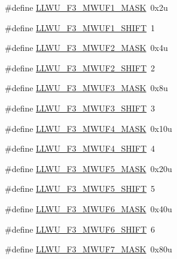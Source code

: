 \begin{DoxyCompactItemize}
\#define \hyperlink{group___l_l_w_u___register___masks_gafe847acbd5a46291dd05b8ab682efffe}{L\+L\+W\+U\+\_\+\+F3\+\_\+\+M\+W\+U\+F1\+\_\+\+M\+A\+SK}~0x2u
\item 
\#define \hyperlink{group___l_l_w_u___register___masks_ga6de4a2380bde727b70758cd1c818c859}{L\+L\+W\+U\+\_\+\+F3\+\_\+\+M\+W\+U\+F1\+\_\+\+S\+H\+I\+FT}~1
\item 
\#define \hyperlink{group___l_l_w_u___register___masks_ga3414123c30550a3dea14d84f931e2a0c}{L\+L\+W\+U\+\_\+\+F3\+\_\+\+M\+W\+U\+F2\+\_\+\+M\+A\+SK}~0x4u
\item 
\#define \hyperlink{group___l_l_w_u___register___masks_gac83dee08de7a4bdce21d454a9cfab059}{L\+L\+W\+U\+\_\+\+F3\+\_\+\+M\+W\+U\+F2\+\_\+\+S\+H\+I\+FT}~2
\item 
\#define \hyperlink{group___l_l_w_u___register___masks_gab85f671f2c6f2112c4e2e14845ef998b}{L\+L\+W\+U\+\_\+\+F3\+\_\+\+M\+W\+U\+F3\+\_\+\+M\+A\+SK}~0x8u
\item 
\#define \hyperlink{group___l_l_w_u___register___masks_ga91a71ba06b95076252cd2594112da05d}{L\+L\+W\+U\+\_\+\+F3\+\_\+\+M\+W\+U\+F3\+\_\+\+S\+H\+I\+FT}~3
\item 
\#define \hyperlink{group___l_l_w_u___register___masks_gabd85c849a3b177444a91aa37457252a8}{L\+L\+W\+U\+\_\+\+F3\+\_\+\+M\+W\+U\+F4\+\_\+\+M\+A\+SK}~0x10u
\item 
\#define \hyperlink{group___l_l_w_u___register___masks_gac1d2eb89a620cf503f11eecf9e8ece1f}{L\+L\+W\+U\+\_\+\+F3\+\_\+\+M\+W\+U\+F4\+\_\+\+S\+H\+I\+FT}~4
\item 
\#define \hyperlink{group___l_l_w_u___register___masks_gaeb14754fa2d5b4c1fd50b9df98f11b01}{L\+L\+W\+U\+\_\+\+F3\+\_\+\+M\+W\+U\+F5\+\_\+\+M\+A\+SK}~0x20u
\item 
\#define \hyperlink{group___l_l_w_u___register___masks_gac8a9d2de72a5034fae66714d25aa5f33}{L\+L\+W\+U\+\_\+\+F3\+\_\+\+M\+W\+U\+F5\+\_\+\+S\+H\+I\+FT}~5
\item 
\#define \hyperlink{group___l_l_w_u___register___masks_gabd1f915448c7918a8aabc74239d7e773}{L\+L\+W\+U\+\_\+\+F3\+\_\+\+M\+W\+U\+F6\+\_\+\+M\+A\+SK}~0x40u
\item 
\#define \hyperlink{group___l_l_w_u___register___masks_gaab649d98d5d8eb9f2f272649ace225c4}{L\+L\+W\+U\+\_\+\+F3\+\_\+\+M\+W\+U\+F6\+\_\+\+S\+H\+I\+FT}~6
\item 
\#define \hyperlink{group___l_l_w_u___register___masks_ga2ddb11dc5e9f8a8404ccf99f10046b5a}{L\+L\+W\+U\+\_\+\+F3\+\_\+\+M\+W\+U\+F7\+\_\+\+M\+A\+SK}~0x80u
\item 

\end{DoxyCompactItemize}
